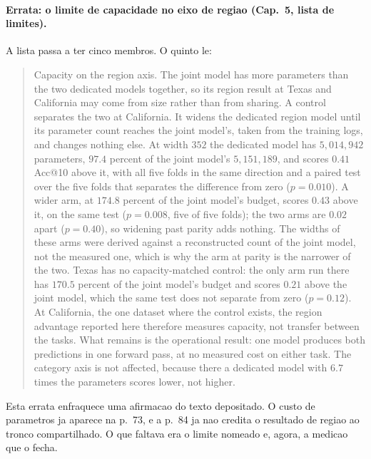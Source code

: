 
\paragraph*{Errata: o limite de capacidade no eixo de regiao (Cap.~5, lista de limites).}
A lista passa a ter cinco membros. O quinto le:

\begin{quote}
Capacity on the region axis. The joint model has more parameters than the two dedicated models
together, so its region result at Texas and California may come from size rather than from sharing.
A control separates the two at California. It widens the dedicated region model until its parameter
count reaches the joint model's, taken from the training logs, and changes nothing else. At width
$352$ the dedicated model has $5{,}014{,}942$ parameters, $97.4$ percent of the joint model's
$5{,}151{,}189$, and scores $0.41$ Acc@10 above it, with all five folds in the same direction and a
paired test over the five folds that separates the difference from zero ($p = 0.010$). A wider arm,
at $174.8$ percent of the joint model's budget, scores $0.43$ above it, on the same test
($p = 0.008$, five of five folds); the two arms are $0.02$ apart ($p = 0.40$), so widening past
parity adds nothing. The widths of these arms were derived
against a reconstructed count of the joint model, not the measured one, which is why the arm at
parity is the narrower of the two. Texas has no capacity-matched control: the only arm run there has
$170.5$ percent of the joint model's budget and scores $0.21$ above the joint model, which the same
test does not separate from zero ($p = 0.12$). At California, the one dataset where the control
exists, the region advantage reported here therefore measures capacity, not transfer between the
tasks. What remains is the operational result: one model produces both predictions in one forward
pass, at no measured cost on either task. The category axis is not affected, because there a
dedicated model with $6.7$ times the parameters scores lower, not higher.
\end{quote}

\noindent
Esta errata enfraquece uma afirmacao do texto depositado. O custo de parametros ja aparece na
p.~73, e a p.~84 ja nao credita o resultado de regiao ao tronco compartilhado. O que faltava era o
limite nomeado e, agora, a medicao que o fecha.
